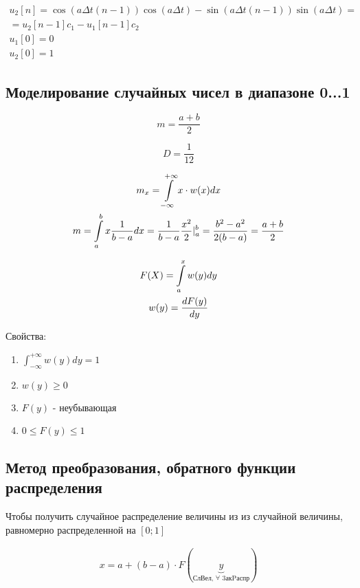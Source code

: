 \documentclass[14pt,a4paper,oneside]{extarticle}
\begin{document}
\begin{gather*}
    u_2[n]=\cos(a\Delta t(n-1))\cos(a\Delta t)-\sin(a\Delta t(n-1))\sin(a\Delta t)=\\
    =u_2[n-1]c_1-u_1[n-1]c_2\\
    u_1[0]=0\\
    u_2[0]=1
\end{gather*}

\subsection{Моделирование случайных чисел в диапазоне 0...1}

\[m=\frac{a+b}{2}\]

\[D=\frac{1}{12}\]

\begin{gather*}
    m_x=\int\displaylimits_{-\infty}^{+\infty} x\cdot w(x)dx\\
    m=\int\displaylimits_{a}^{b}x\frac{1}{b-a}dx=\frac{1}{b-a}\frac{x^2}{2}|_a^b=\frac{b^2-a^2}{2(b-a)}=\frac{a+b}{2}
\end{gather*}

\begin{gather*}
    F(X)=\int\displaylimits_{a}^{x}w(y)dy\\
    w(y)=\frac{dF(y)}{dy}\\
\end{gather*}

Свойства:

\begin{enumerate}
    \item $\int_{-\infty}^{+\infty}w(y)dy=1$
    \item $w(y)\geq 0$
    \item $F(y)$ - неубывающая
    \item $0\leq F(y)\leq 1$
\end{enumerate}

\subsection{Метод преобразования, обратного функции распределения}

Чтобы получить случайное распределение величины из из случайной величины, равномерно распределенной на $[0;1]$

\begin{gather*}
    x=a+(b-a)\cdot F\left(\underbrace{y}_{\text{СлВел, } \forall \text{ 3акPаспр}}\right)
\end{gather*}
\end{document}
